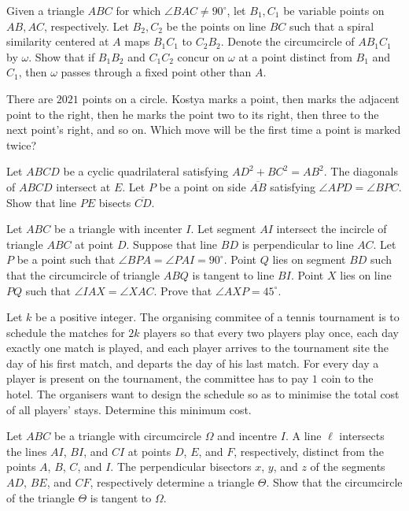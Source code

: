 \documentclass[11pt]{scrartcl}
\begin{document}
\begin{problem}[852531542088551]
	Given a triangle $ABC$ for which $\angle BAC \neq 90^{\circ}$, let $B_1, C_1$ be variable points on $AB,AC$, respectively. Let $B_2,C_2$ be the points on line $BC$ such that a spiral similarity centered at $A$ maps $B_1C_1$ to $C_2B_2$. Denote the circumcircle of $AB_1C_1$ by $\omega$. Show that if $B_1B_2$ and $C_1C_2$ concur on $\omega$ at a point distinct from $B_1$ and $C_1$, then $\omega$ passes through a fixed point other than $A$.
\end{problem}
\begin{problem}[4742951979457606021]
There are $2021$ points on a circle. Kostya marks a point, then marks the adjacent point to the right, then he marks the point two to its right, then three to the next point's right, and so on. Which move will be the first time a point is marked twice?
\end{problem}
\begin{problem}[287986230573307]
Let $ABCD$ be a cyclic quadrilateral satisfying $AD^2 + BC^2 = AB^2$. The diagonals of $ABCD$ intersect at $E$. Let $P$ be a point on side $\overline{AB}$ satisfying $\angle APD = \angle BPC$. Show that line $PE$ bisects $\overline{CD}$.
\end{problem}
\begin{problem}[548248988934632]
Let $ABC$ be a triangle with incenter $I$. Let segment $AI$ intersect the incircle of triangle $ABC$ at point $D$. Suppose that line $BD$ is perpendicular to line $AC$. Let $P$ be a point such that $\angle BPA = \angle PAI = 90^\circ$. Point $Q$ lies on segment $BD$ such that the circumcircle of triangle $ABQ$ is tangent to line $BI$. Point $X$ lies on line $PQ$ such that $\angle IAX = \angle XAC$. Prove that $\angle AXP = 45^\circ$.
\end{problem}
\begin{problem}[8916142707013964275]
	Let $k$ be a positive integer. The organising commitee of a tennis tournament is to schedule the matches for $2k$ players so that every two players play once, each day exactly one match is played, and each player arrives to the tournament site the day of his first match, and departs the day of his last match. For every day a player is present on the tournament, the committee has to pay $1$ coin to the hotel. The organisers want to design the schedule so as to minimise the total cost of all players' stays. Determine this minimum cost.
\end{problem}
\begin{problem}[719467452801051]
Let $ABC$ be a triangle with circumcircle $\Omega$ and incentre $I$. A line $\ell$ intersects the lines $AI$, $BI$, and $CI$ at points $D$, $E$, and $F$, respectively, distinct from the points $A$, $B$, $C$, and $I$. The perpendicular bisectors $x$, $y$, and $z$ of the segments $AD$, $BE$, and $CF$, respectively determine a triangle $\Theta$. Show that the circumcircle of the triangle $\Theta$ is tangent to $\Omega$.
\end{problem}
\end{document}
